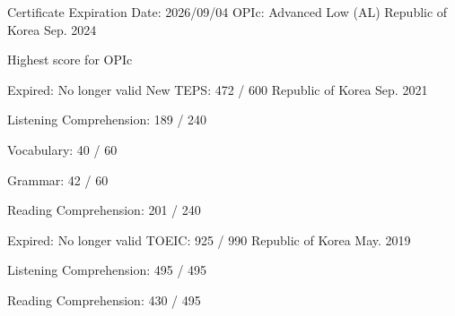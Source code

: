 

\begin{cventries}

  \cventry
    {Certificate Expiration Date: 2026/09/04} %
    {OPIc: Advanced Low (AL)} %
    {Republic of Korea} %
    {Sep. 2024} %
    {
      \begin{cvitems} %
        \item {Highest score for OPIc}
      \end{cvitems}
    }

  \cventry
    {Expired: No longer valid} %
    {New TEPS: 472 / 600} %
    {Republic of Korea} %
    {Sep. 2021} %
    {
      \begin{cvitems} %
        \item {Listening Comprehension: 189 / 240}
        \item {Vocabulary: 40 / 60}
        \item {Grammar: 42 / 60}
        \item {Reading Comprehension: 201 / 240}
      \end{cvitems}
    }

  \cventry
    {Expired: No longer valid} %
    {TOEIC: 925 / 990} %
    {Republic of Korea} %
    {May. 2019} %
    {
      \begin{cvitems} %
        \item {Listening Comprehension: 495 / 495}
        \item {Reading Comprehension: 430 / 495}
      \end{cvitems}
    }


\end{cventries}
